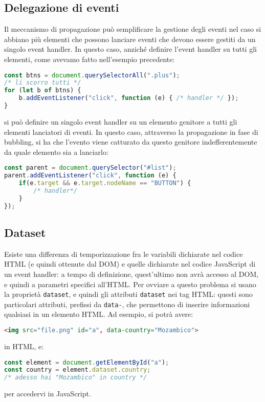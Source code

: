 \documentclass[a4paper,11pt]{article}
\begin{document}
\subsection{Delegazione di eventi}
Il meccanismo di propagazione può semplificare la gestione degli eventi nel caso si abbiano più elementi che possono lanciare eventi che devono essere gestiti da un singolo event handler.
In questo caso, anziché definire l'event handler su tutti gli elementi, come avevamo fatto nell'esempio precedente:
\begin{lstlisting}[language=javascript, style=codestyle]	
const btns = document.querySelectorAll(".plus");
/* li scorro tutti */
for (let b of btns) {
	b.addEventListener("click", function (e) { /* handler */ });
}
\end{lstlisting}

si può definire un singolo event handler su un elemento genitore a tutti gli elementi lanciatori di eventi.
In questo caso, attraverso la propagazione in fase di bubbling, si ha che l'evento viene catturato da questo genitore indefferentemente da quale elemento sia a lanciarlo:
\begin{lstlisting}[language=javascript, style=codestyle]	
const parent = document.querySelector("#list");
parent.addEventListener("click", function (e) {
	if(e.target && e.target.nodeName == "BUTTON") {
		/* handler*/
	}
});
\end{lstlisting}

\subsection{Dataset}
Esiste una differenza di temporizzazione fra le variabili dichiarate nel codice HTML (e quindi ottenute dal DOM) e quelle dichiarate nel codice JavaScript di un event handler: a tempo di definizione, quest'ultimo non avrà accesso al DOM, e quindi a parametri specifici all'HTML.
Per ovviare a questo problema si usano la proprietà \lstinline|dataset|, e quindi gli attributi \lstinline|dataset| nei tag HTML: questi sono particolari attributi, prefissi da \lstinline|data-|, che permettono di inserire informazioni qualsiasi in un elemento HTML.
Ad esempio, si potrà avere:
\begin{lstlisting}[language=html, style=codestyle]	
<img src="file.png" id="a", data-country="Mozambico">
\end{lstlisting}
in HTML, e:
\begin{lstlisting}[language=javascript, style=codestyle]	
const element = document.getElementById("a");
const country = element.dataset.country;
/* adesso hai "Mozambico" in country */
\end{lstlisting}
per accedervi in JavaScript.
\end{document}

